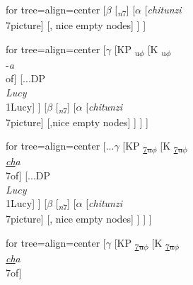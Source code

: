 \documentclass[output=paper
,modfonts
,nonflat]{langsci/langscibook}
\begin{document}
\begin{figure}
\begin{exe}
	\ex \label{ex:29}
	\begin{xlista}
	\begin{multicols}{2}\raggedcolumns
		\ex \label{ex:29a}
		\begin{forest} for tree={align=center}
			[$\beta$ 
			[\textsubscript{\textit{n}7}]	
			[$\alpha$
			[\textit{chitunzi}\\7picture]
			[, nice empty nodes]
			] ] 	
		\end{forest}\vfill\null\columnbreak
		\ex \label{ex:29b}
		\begin{forest} for tree={align=center}
			[$\gamma$ 
			[KP \textsubscript{\ul{}u$\phi$}
			[K \textsubscript{\ul{}u$\phi$}	\\ -\textit{a}\\of]
			[...DP\\ \textit{Lucy}\\1Lucy] ]
			[$\beta$
			[\textsubscript{\textit{n}7}]
			[$\alpha$
			[\textit{chitunzi}\\7picture]
			[,nice empty nodes]
			] ] ] 
		\end{forest}
	\end{multicols}
	\end{xlista}
	\begin{xlista}
	\setcounter{xnumii}{2}
	\begin{multicols}{2}\raggedcolumns                
		\ex \label{ex:29c}
		\begin{forest} for tree={align=center}
			[...$\gamma$ 
			[KP \textsubscript{\underline{7}\sout{u$\phi$}}
			[K \textsubscript{\underline{7}\sout{u$\phi$}}\\ \textit{\underline{ch}a}\\7of]
			[...DP\\ \textit{Lucy}\\1Lucy] ]
			[$\beta$
			[\textsubscript{\textit{n}7}]
			[$\alpha$
			[\textit{chitunzi}\\7picture]
			[, nice empty nodes]
			] ] ]  		
		\end{forest}
		\ex \label{ex:29d}
		\begin{forest} for tree={align=center}
			[$\gamma$ 
			[KP \textsubscript{\underline{7}\sout{u$\phi$}}
			[K \textsubscript{\underline{7}\sout{u$\phi$}}\\ \textit{\underline{ch}a}\\7of]

\end{forest}
\end{multicols}
\end{xlista}
\end{exe}
\end{figure}
\end{document}
